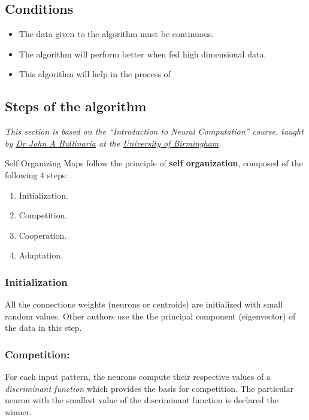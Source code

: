 \documentclass[]{book}
\providecommand{\tightlist}{%
  \setlength{\itemsep}{0pt}\setlength{\parskip}{0pt}}
\begin{document}
\subsection{Conditions}\label{conditions}

\begin{itemize}
\tightlist
\item
  The data given to the algorithm must be continuous.
\item
  The algorithm will perform better when fed high dimensional data.
\item
  This algorithm will help in the process of
\end{itemize}

\subsection{Steps of the algorithm}\label{steps-of-the-algorithm}

\emph{This section is based on the ``Introduction to Neural
Computation'' course, taught by \href{http://www.cs.bham.ac.uk/~jxb/}{Dr
John A Bullinaria} at the \href{http://www.cs.bham.ac.uk}{University of
Birmingham}.}

Self Organizing Maps follow the principle of \textbf{self organization},
composed of the following 4 steps:

\begin{enumerate}
\def\labelenumi{\arabic{enumi}.}
\tightlist
\item
  Initialization.
\item
  Competition.
\item
  Cooperation.
\item
  Adaptation.
\end{enumerate}

\subsubsection{Initialization}\label{initialization}

All the connections weights (neurons or centroids) are initialized with
small random values. Other authors use the the principal component
(eigenvector) of the data in this step.

\subsubsection{Competition:}\label{competition}

For each input pattern, the neurons compute their respective values of a
\emph{discriminant function} which provides the basis for competition.
The particular neuron with the smallest value of the discriminant
function is declared the winner.
\end{document}
